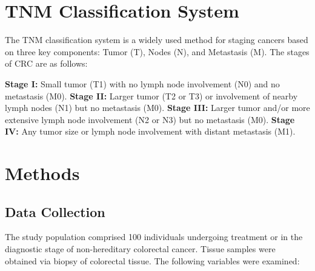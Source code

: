 \documentclass[12pt]{article}
\begin{document}
\section{TNM Classification System}

The TNM classification system is a widely used method for staging cancers based on three key components: Tumor (T), Nodes (N), and Metastasis (M). The stages of CRC are as follows:

\textbf{Stage I:} Small tumor (T1) with no lymph node involvement (N0) and no metastasis (M0).
\textbf{Stage II:} Larger tumor (T2 or T3) or involvement of nearby lymph nodes (N1) but no metastasis (M0).
\textbf{Stage III:} Larger tumor and/or more extensive lymph node involvement (N2 or N3) but no metastasis (M0).
\textbf{Stage IV:} Any tumor size or lymph node involvement with distant metastasis (M1).


\section{Methods}

\subsection{Data Collection}

The study population comprised 100 individuals undergoing treatment or in the diagnostic stage of non-hereditary colorectal cancer. Tissue samples were obtained via biopsy of colorectal tissue. The following variables were examined:
\end{document}
